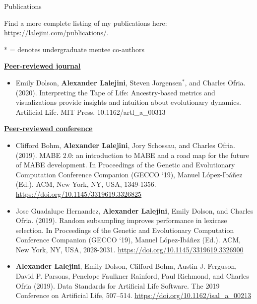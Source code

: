 \begin{rSection}{Publications}

Find a more complete listing of my publications here: \url{https://lalejini.com/publications/}.

* = denotes undergraduate mentee co-authors

\underline{\large {\bf Peer-reviewed journal}}

\begin{itemize}
  \item Emily Dolson, \textbf{Alexander Lalejini}, Steven Jorgensen$^{*}$, and Charles Ofria. (2020).
  Interpreting the Tape of Life: Ancestry-based metrics and visualizations provide insights and intuition about evolutionary dynamics.
  Artificial Life. MIT Press. 10.1162/artl\_a\_00313
\end{itemize}

\underline{\large {\bf Peer-reviewed conference}}

\begin{itemize}

\item Clifford Bohm, \textbf{Alexander Lalejini}, Jory Schossau, and Charles Ofria. (2019).
MABE 2.0: an introduction to MABE and a road map for the future of MABE development.
In Proceedings of the Genetic and Evolutionary Computation Conference Companion (GECCO ‘19), Manuel López-Ibáñez (Ed.). ACM, New York, NY, USA, 1349-1356.
\url{https://doi.org/10.1145/3319619.3326825}

\item Jose Guadalupe Hernandez, \textbf{Alexander Lalejini}, Emily Dolson, and Charles Ofria. (2019).
Random subsampling improves performance in lexicase selection.
In Proceedings of the Genetic and Evolutionary Computation Conference Companion (GECCO ‘19), Manuel López-Ibáñez (Ed.). ACM, New York, NY, USA, 2028-2031.
\url{https://doi.org/10.1145/3319619.3326900}

\item \textbf{Alexander Lalejini}, Emily Dolson, Clifford Bohm, Austin J. Ferguson, David P. Parsons, Penelope Faulkner Rainford, Paul Richmond, and Charles Ofria (2019).
Data Standards for Artificial Life Software.
The 2019 Conference on Artificial Life, 507–514.
\url{https://doi.org/10.1162/isal_a_00213}


\end{itemize}
\end{rSection}
